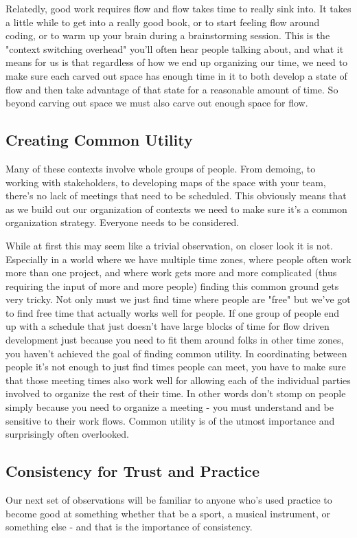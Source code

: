 \documentclass[10pt,a5paper]{book}
\begin{document}
Relatedly, good work requires flow and flow takes time to really sink into. It takes a little while to get into a really good book, or to start feeling flow around coding, or to warm up your brain during a brainstorming session. This is the "context switching overhead" you'll often hear people talking about, and what it means for us is that regardless of how we end up organizing our time, we need to make sure each carved out space has enough time in it to both develop a state of flow and then take advantage of that state for a reasonable amount of time. So beyond carving out space we must also carve out enough space for flow.

\subsection{Creating Common Utility}
Many of these contexts involve whole groups of people. From demoing, to working with stakeholders, to developing maps of the space with your team, there's no lack of meetings that need to be scheduled. This obviously means that as we build out our organization of contexts we need to make sure it's a common organization strategy. Everyone needs to be considered. 

While at first this may seem like a trivial observation, on closer look it is not. Especially in a world where we have multiple time zones, where people often work more than one project, and where work gets more and more complicated (thus requiring the input of more and more people) finding this common ground gets very tricky. Not only must we just find time where people are "free" but we've got to find free time that actually works well for people. If one group of people end up with a schedule that just doesn't have large blocks of time for flow driven development just because you need to fit them around folks in other time zones, you haven't achieved the goal of finding common utility. In coordinating between people it's not enough to just find times people can meet, you have to make sure that those meeting times also work well for allowing each of the individual parties involved to organize the rest of their time. In other words don't stomp on people simply because you need to organize a meeting - you must understand and be sensitive to their work flows. Common utility is of the utmost importance and surprisingly often overlooked. 

\subsection{Consistency for Trust and Practice}
Our next set of observations will be familiar to anyone who's used practice to become good at something whether that be a sport, a musical instrument, or something else - and that is the importance of consistency. 
\end{document}
